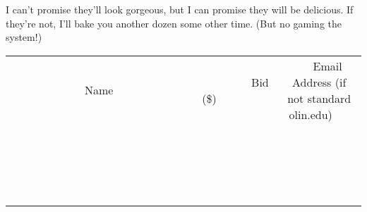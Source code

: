 \documentclass[11pt]{article}
\begin{document}
I can't promise they'll look gorgeous, but I can promise they will be delicious. If they're not, I'll bake you another dozen some other time. (But no gaming the system!)
\\[3ex]
\begin{tabular}{c c c}
~~~~~~~~~~~~~Name~~~~~~~~~~~~~ & ~~~~~~~~~Bid (\$)~~~~~~~~~  & ~~~Email Address (if not standard olin.edu)~~~\\
 & & \\
\hline
 & & \\
\hline
 & & \\
\hline
 & & \\
\hline
 & & \\
\hline
 & & \\
\hline
 & & \\
\hline
 & & \\
\hline
 & & \\
\hline
 & & \\
\hline
 & & \\
\hline
 & & \\
\hline
 & & \\
\hline
 & & \\
\hline
 & & \\
\hline
 & & \\
\hline
 & & \\
\hline
 & & \\
\hline
 & & \\
\hline
\end{tabular}
\newpage
\end{document}
